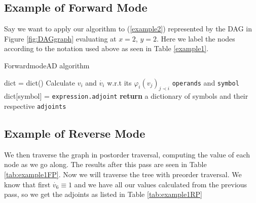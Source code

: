 \documentclass{article}
\begin{document}
\subsection{Example of Forward Mode}

Say we want to apply our algorithm to (\ref{example2}) represented by the DAG in Figure \ref{fig:DAGgraph} evaluating at $x=2$, $y=2$. Here we label the nodes according to the notation used above as seen in Table \ref{example1}. 



\begin{algorithm}[h]
\caption{ForwardmodeAD algorithm}\label{forwardAD}
\begin{algorithmic}[1]
\State dict = dict()\Comment{}
    \State Calculate $v_i$ and $\Dot{v_i}$ w.r.t its $\varphi_i(v_j)_{j \prec i}$ \verb|operands| and \verb|symbol|
    \State dict[symbol] = \verb|expression.adjoint|
    \EndFor
\EndFor
\State \textbf{return} a dictionary of symbols and their respective \verb|adjoints|
\EndProcedure
\end{algorithmic}
\end{algorithm}

\subsection{Example of Reverse Mode}


We then traverse the graph in postorder traversal, computing the value of each node as we go along. The results after this pass are seen in Table \ref{tab:example1FP}. Now we will traverse the tree with preorder traversal. We know that first $\dot{v_6} \equiv 1$ and we have all our values calculated from the previous pass, so we get the adjoints as listed in Table \ref{tab:example1RP}
\end{document}
